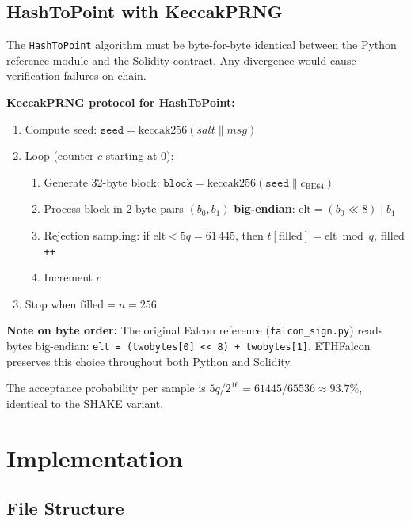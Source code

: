 \documentclass[11pt,a4paper]{article}
\begin{document}
\subsection{HashToPoint with KeccakPRNG}

\begin{warningbox}
The \texttt{HashToPoint} algorithm must be byte-for-byte identical between the
Python reference module and the Solidity contract. Any divergence would cause
verification failures on-chain.
\end{warningbox}

\textbf{KeccakPRNG protocol for HashToPoint:}
\begin{enumerate}
  \item Compute seed: $\texttt{seed} = \mathrm{keccak256}(salt \| msg)$
  \item Loop (counter $c$ starting at 0):
    \begin{enumerate}
      \item Generate 32-byte block:
            $\texttt{block} = \mathrm{keccak256}(\texttt{seed} \| c_{\mathrm{BE64}})$
      \item Process block in 2-byte pairs $(b_0, b_1)$
            \textbf{big-endian}: $\mathrm{elt} = (b_0 \ll 8) \mid b_1$
      \item Rejection sampling: if $\mathrm{elt} < 5q = 61\,445$, then
            $t[\mathrm{filled}] = \mathrm{elt} \bmod q$, $\mathrm{filled}$\texttt{++}
      \item Increment $c$
    \end{enumerate}
  \item Stop when $\mathrm{filled} = n = 256$
\end{enumerate}

\textbf{Note on byte order:} The original Falcon reference (\texttt{falcon\_sign.py})
reads bytes big-endian: \texttt{elt = (twobytes[0] << 8) + twobytes[1]}.
ETHFalcon preserves this choice throughout both Python and Solidity.

The acceptance probability per sample is $5q / 2^{16} = 61445/65536 \approx 93.7\%$,
identical to the SHAKE variant.

\section{Implementation}

\subsection{File Structure}
\end{document}
